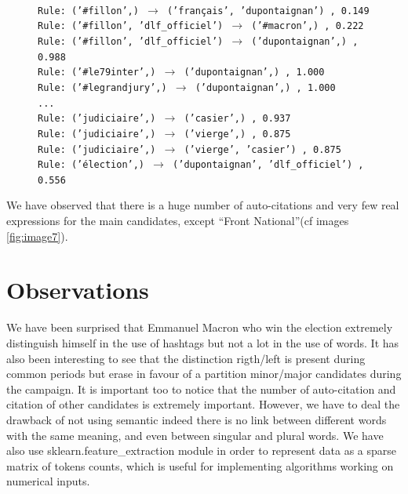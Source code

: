 \documentclass[a4paper]{article}
\theoremstyle{definition}
\begin{document}
\begin{figure}
\begingroup
\fontsize{9pt}{12pt}
\texttt{\\
Rule: ('\#fillon',) $\to$ ('français', 'dupontaignan') , 0.149\\
Rule: ('\#fillon', 'dlf\_officiel') $\to$ ('\#macron',) , 0.222\\
Rule: ('\#fillon', 'dlf\_officiel') $\to$ ('dupontaignan',) , 0.988\\
Rule: ('\#le79inter',) $\to$ ('dupontaignan',) , 1.000\\
Rule: ('\#legrandjury',) $\to$ ('dupontaignan',) , 1.000\\
...\\
Rule: ('judiciaire',) $\to$ ('casier',) , 0.937\\
Rule: ('judiciaire',) $\to$ ('vierge',) , 0.875\\
Rule: ('judiciaire',) $\to$ ('vierge', 'casier') , 0.875\\
Rule: ('élection',) $\to$ ('dupontaignan', 'dlf\_officiel') , 0.556\\
}
\endgroup
{}
\end{figure}

We have observed that there is a huge number of auto-citations and very few real expressions for the main candidates, except ``Front National''(cf images \ref{fig:image7}).


\section{Observations}
We have been surprised that Emmanuel Macron who win the election extremely distinguish himself in the use of hashtags but not a lot in the use of words.
It has also been interesting to see that the distinction rigth/left is present during common periods but erase in favour of a partition minor/major candidates during the campaign.
It is important too to notice that the number of auto-citation and citation of other candidates is extremely important.
However, we have to deal the drawback of not using semantic indeed there is no link between different words with the same meaning, and even between singular and plural words.
We have also use sklearn.feature_extraction module in order to represent data as a sparse matrix of tokens counts, which is useful for implementing algorithms working on numerical inputs.
\end{document}
